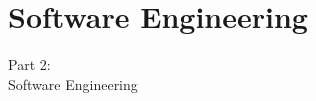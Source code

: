 \section{Software Engineering}
\begin{frame}
    \vspace{25mm}
    \begin{center}
        \Huge{Part 2:\\Software Engineering}
    \end{center}
\end{frame}

\newcommand{\entry}[6]{
  \node[
    rectangle,
    draw=purple,
    anchor=south west,
    align=center,
    minimum height=\cellheight,
    minimum width=(#4-#3)*\cellwidth+((#4-#3)-1)*\cellspacing,
  ]
  (#1) at (
    [
      xshift=\xoffset+#3*\cellwidth+(#3-1)*\cellspacing,
      yshift=\yoffset+(#2-1)*\cellheight+(#2-2)*\cellspacing,
    ] semorigo)
  {
    #5\\\textcolor{orange}{#6 ECTS}
  }
}

